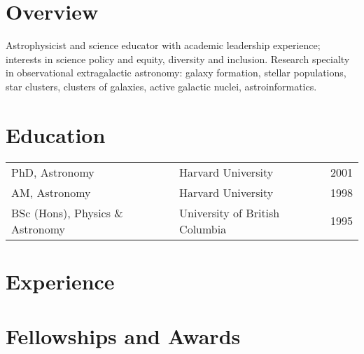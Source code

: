 \documentclass[12pt]{article}
\begin{document}
\maketitle


\vspace{1cm}

\section{Overview}
Astrophysicist and science educator with academic leadership experience; interests in science policy and equity, diversity and inclusion.
Research specialty in observational extragalactic astronomy: galaxy formation, stellar populations, star clusters,
clusters of galaxies, active galactic nuclei, astroinformatics.


\vspace{0.6cm}
\section{Education}
\begin{tabularx}{\textwidth}{lXr}
PhD, Astronomy & Harvard University & 2001\\
AM, Astronomy & Harvard University & 1998\\
BSc (Hons),  Physics \& Astronomy & University of British Columbia&1995\\
\end{tabularx}

\vspace{0.6cm}
\section{Experience} 


%

\vspace{0.6cm}
\section{Fellowships and Awards}


\clearpage
\end{document}
